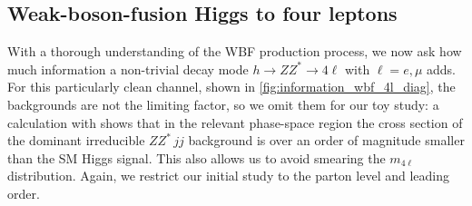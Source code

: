 



\subsection{Weak-boson-fusion Higgs to four leptons}
\label{sec:information_wbf_4l}

With a thorough understanding of the WBF production process, we now
ask how much information a non-trivial decay mode
$h \to ZZ^* \to 4 \ell$ with $\ell = e, \mu$ adds. For this
particularly clean channel, shown in
\autoref{fig:information_wbf_4l_diag}, the backgrounds are not the
limiting factor, so we omit them for our toy study: a calculation with
 shows that in the relevant phase-space region
the cross section of the dominant irreducible $ZZ^* \,jj$ background
is over an order of magnitude smaller than the SM Higgs signal. This
also allows us to avoid smearing the $m_{4\ell}$ distribution. Again,
we restrict our initial study to the parton level and leading order.

